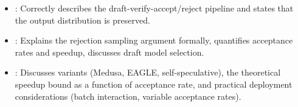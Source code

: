 \begin{interviewq}

\goodgreat
\begin{itemize}
    \item {}: Correctly describes the draft-verify-accept/reject pipeline
          and states that the output distribution is preserved.
    \item {}: Explains the rejection sampling argument formally, quantifies
          acceptance rates and speedup, discusses draft model selection.
    \item {}: Discusses variants (Medusa, EAGLE, self-speculative), the
          theoretical speedup bound as a function of acceptance rate, and practical
          deployment considerations (batch interaction, variable acceptance rates).
\end{itemize}

\end{interviewq}

\vspace{0.5em}

